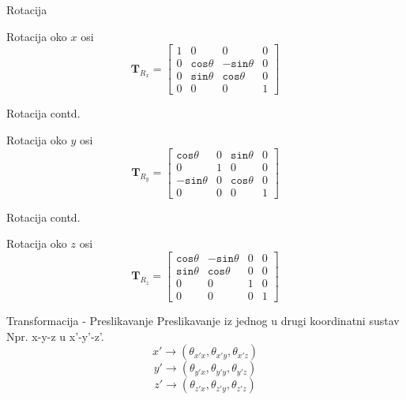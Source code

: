 \documentclass[9pt]{beamer}
\begin{document}
\begin{frame}{Rotacija}
	\begin{block}{Rotacija oko $x$ osi}
		\[    \mathbf{T}_{R_{x}} = \left[ \begin{array}{cccc}
		1 & 0 & 0 & 0 \\
		0 & \mathtt{cos}\theta & -\mathtt{sin}\theta & 0 \\
		0 & \mathtt{sin}\theta & \mathtt{cos}\theta & 0 \\
		0 & 0 & 0 & 1 
		\end{array} \right] \]
	\end{block}
\end{frame}

\begin{frame}{Rotacija contd.}
	\begin{block}{Rotacija oko $y$ osi}
		\[    \mathbf{T}_{R_{y}} = \left[ \begin{array}{cccc}
		\mathtt{cos}\theta & 0 & \mathtt{sin}\theta & 0 \\
		0 & 1 & 0 & 0 \\
		-\mathtt{sin}\theta & 0 & \mathtt{cos}\theta & 0 \\
		0 & 0 & 0 & 1 
		\end{array} \right] \]
	\end{block}
\end{frame}

\begin{frame}{Rotacija contd.}
	\begin{block}{Rotacija oko $z$ osi}
		\[    \mathbf{T}_{R_{z}} = \left[ \begin{array}{cccc}
		\mathtt{cos}\theta & -\mathtt{sin}\theta & 0 & 0 \\
		\mathtt{sin}\theta & \mathtt{cos}\theta & 0 & 0 \\
		0 & 0 & 1 & 0 \\
		0 & 0 & 0 & 1 
		\end{array} \right] \]
	\end{block}
\end{frame}


\begin{frame}{Transformacija - Preslikavanje}
	Preslikavanje iz jednog u drugi koordinatni sustav\\
	Npr. x-y-z u x'-y'-z'.
	$$ x'\rightarrow \left(\theta_{x'x}, \theta_{x'y}, \theta_{x'z}\right)$$
	$$ y'\rightarrow \left(\theta_{y'x}, \theta_{y'y}, \theta_{y'z}\right)$$
	$$ z'\rightarrow \left(\theta_{z'x}, \theta_{z'y}, \theta_{z'z}\right)$$
\end{frame}
\end{document}

